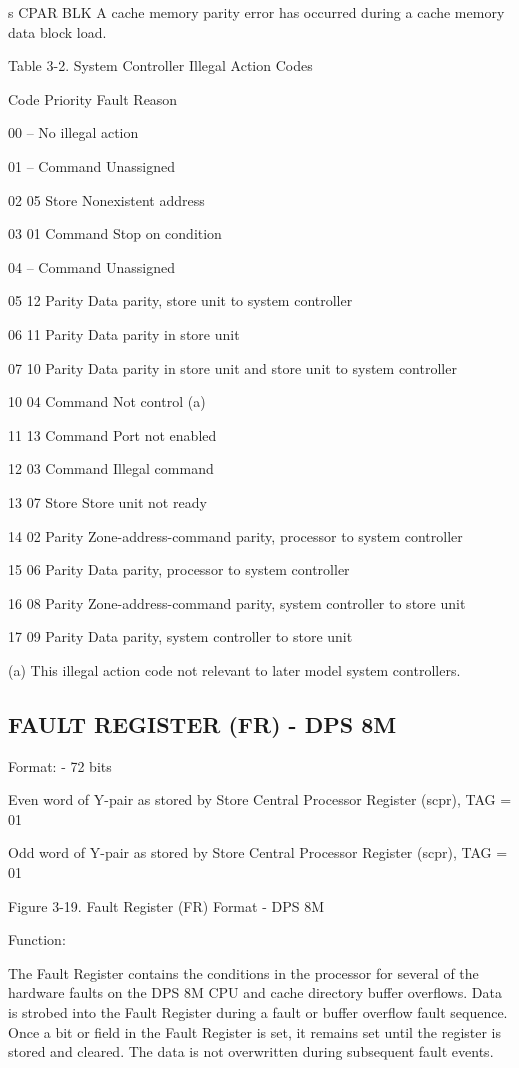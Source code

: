 s CPAR BLK A cache memory parity error has occurred during a cache memory data block load.

Table 3-2. System Controller Illegal Action Codes

Code Priority Fault Reason

00 -- No illegal action

01 -- Command Unassigned

02 05 Store Nonexistent address

03 01 Command Stop on condition

04 -- Command Unassigned

05 12 Parity Data parity, store unit to system controller

06 11 Parity Data parity in store unit

07 10 Parity Data parity in store unit and store unit to system controller

10 04 Command Not control (a)

11 13 Command Port not enabled

12 03 Command Illegal command

13 07 Store Store unit not ready

14 02 Parity Zone-address-command parity, processor to system controller

15 06 Parity Data parity, processor to system controller

16 08 Parity Zone-address-command parity, system controller to store unit

17 09 Parity Data parity, system controller to store unit

(a) This illegal action code not relevant to later model system controllers.

\subsection{FAULT REGISTER (FR) - DPS 8M}

Format: - 72 bits

Even word of Y-pair as stored by Store Central Processor Register (scpr), TAG = 01

Odd word of Y-pair as stored by Store Central Processor Register (scpr), TAG = 01

Figure 3-19. Fault Register (FR) Format - DPS 8M

Function:

The Fault Register contains the conditions in the processor for several of the
hardware faults on the DPS 8M CPU and cache directory buffer overflows. Data is
strobed into the Fault Register during a fault or buffer overflow fault
sequence. Once a bit or field in the Fault Register is set, it remains set
until the register is stored and cleared. The data is not overwritten during
subsequent fault events.

